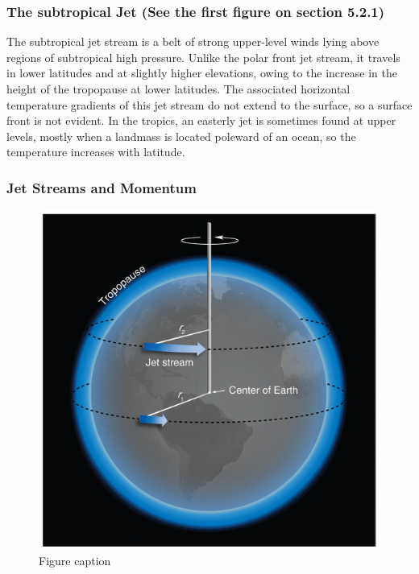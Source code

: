 \documentclass[12pt,oneside]{book}
\begin{document}
\subsubsection{The subtropical Jet (See the first figure on section
5.2.1)}\label{the-subtropical-jet-see-the-first-figure-on-section-5.2.1}

The subtropical jet stream is a belt of strong upper-level winds lying
above regions of subtropical high pressure. Unlike the polar front jet
stream, it travels in lower latitudes and at slightly higher elevations,
owing to the increase in the height of the tropopause at lower
latitudes. The associated horizontal temperature gradients of this jet
stream do not extend to the surface, so a surface front is not evident.
In the tropics, an easterly jet is sometimes found at upper levels,
mostly when a landmass is located poleward of an ocean, so the
temperature increases with latitude.

\subsubsection{Jet Streams and Momentum}\label{jet-streams-and-momentum}

\begin{figure}

{\centering \includegraphics[width=0.8\linewidth]{figures/Figure522b} 

}

\caption{Figure caption}\label{fig:Fig522b}
\end{figure}
\end{document}
